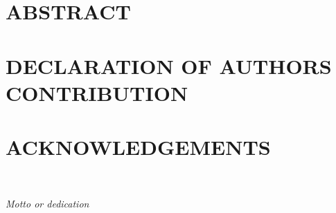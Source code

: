 \chapter*{ABSTRACT}
%
%
\clearpage
\chapter*{DECLARATION OF AUTHORS CONTRIBUTION}
%
%
\clearpage
\chapter*{ACKNOWLEDGEMENTS}
%
%
\cleardoublepage
~
\vspace*{\fill}
\begin{center}
  \emph{Motto or dedication}
\end{center}
\vspace*{\fill}
\cleardoublepage
